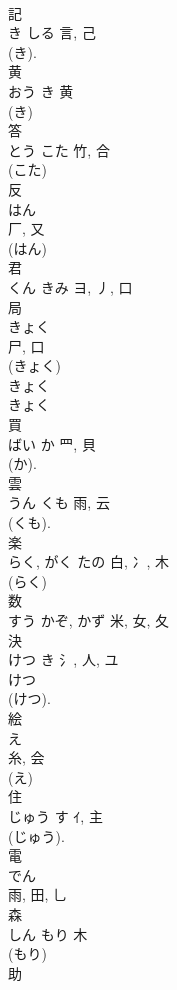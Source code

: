 \documentclass[8pt]{extreport}
\begin{document}
\begin{CJK}{UTF8}{min}
\\	記	
\\	き	しる	言, 己	
\\	(き). 
\\	黄	
\\	おう	き	黄	
\\	(き) 
\\	答	
\\	とう	こた	竹, 合	
\\	(こた) 
\\	反	
\\	はん	
\\	厂, 又	
\\	(はん) 
\\	君	
\\	くん	きみ	ヨ, 丿, 口	
\\	局	
\\	きょく	
\\	尸, 口		
\\	(きょく) 
\\	きょく 
\\	きょく 
\\	買	
\\	ばい	か	罒, 貝	
\\	(か). 
\\	雲	
\\	うん	くも	雨, 云	
\\	(くも). 
\\	楽	
\\	らく, がく	たの	白, 冫, 木	
\\	(らく) 
\\	数	
\\	すう	かぞ, かず	米, 女, 夂	
\\	決	
\\	けつ	き	氵, 人, ユ	
\\	けつ 
\\	(けつ).
\\	絵	
\\	え	
\\	糸, 会	
\\	(え)
\\	住	
\\	じゅう	す	ｲ, 主	
\\	(じゅう). 
\\	電	
\\	でん	
\\	雨, 田, 乚	
\\	森	
\\	しん	もり	木	
\\	(もり) 
\\	助	

\end{CJK}
\end{document}
